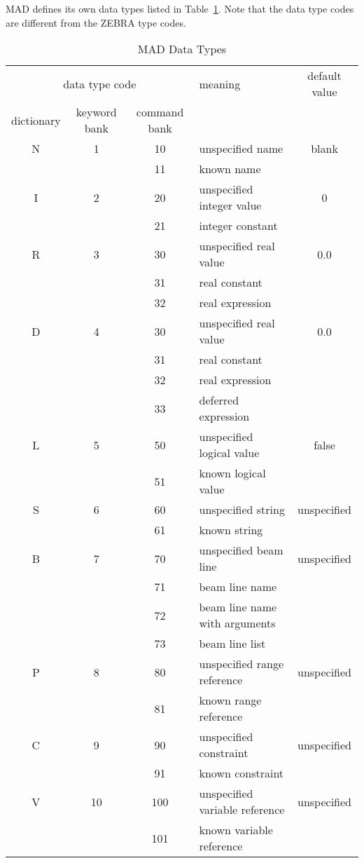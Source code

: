 MAD defines its own data types listed in Table~\ref{Tmadt}.
Note that the data type codes are different from the ZEBRA type codes.
\begin{table}[ht]
\caption{MAD Data Types}
\label{Tmadt}
\centering
\vspace{1ex}
\begin{tabular}{|c|c|c|l|c|}
\hline
\multicolumn{3}{|c|}{data type code} &meaning &default value\\
dictionary &keyword bank &command bank &&\\
\hline
N&1 &10 &unspecified name &blank\\
& &11 &known name &\\
\hline
I&2 &20 &unspecified integer value &0\\
& &21 &integer constant &\\
\hline
R&3 &30 &unspecified real value &0.0\\
& &31 &real constant &\\
& &32 &real expression &\\
\hline
D&4 &30 &unspecified real value &0.0\\
& &31 &real constant &\\
& &32 &real expression &\\
& &33 &deferred expression &\\
\hline
L&5 &50 &unspecified logical value &false\\
& &51 &known logical value &\\
\hline
S&6 &60 &unspecified string &unspecified\\
& &61 &known string &\\
\hline
B&7 &70 &unspecified beam line  &unspecified\\
& &71 &beam line name &\\
& &72 &beam line name with arguments &\\
& &73 &beam line list &\\
\hline
P&8 &80 &unspecified range reference &unspecified\\
& &81 &known range reference &\\
\hline
C&9 &90 &unspecified constraint &unspecified\\
& &91 &known constraint &\\
\hline
V &10 &100 &unspecified variable reference &unspecified\\
& &101 &known variable reference &\\
\hline
\end{tabular}
\end{table}
 
